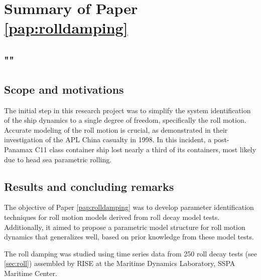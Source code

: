 \section{Summary of Paper \ref{pap:rolldamping}}
\subsection*{""}
\subsection*{Scope and motivations}
The initial step in this research project was to simplify the system identification of the ship dynamics to a single degree of freedom, specifically the roll motion. Accurate modeling of the roll motion is crucial, as \textcite{franceInvestigationHeadSeaParametric2001} demonstrated in their investigation of the APL China casualty in 1998. In this incident, a post-Panamax C11 class container ship lost nearly a third of its containers, most likely due to head sea parametric rolling.

\subsection*{Results and concluding remarks}
The objective of Paper \ref{pap:rolldamping} was to develop parameter identification techniques for roll motion models derived from roll decay model tests. Additionally, it aimed to propose a parametric model structure for roll motion dynamics that generalizes well, based on prior knowledge from these model tests.

The roll damping was studied using time series data from 250 roll decay tests (see \autoref{sec:roll}) assembled by RISE at the Maritime Dynamics Laboratory, SSPA Maritime Center.


